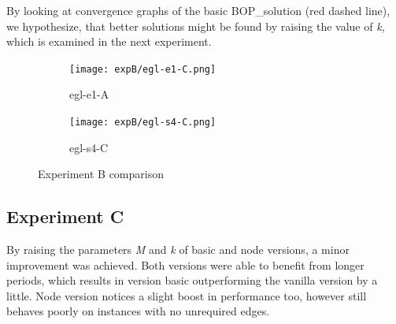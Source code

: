 \documentclass[twoside]{ctuthesis}
\theoremstyle{plain}
\theoremstyle{definition}
\theoremstyle{note}
\begin{document}
By looking at convergence graphs of the basic BOP\_solution (red dashed line), we hypothesize, that better solutions might be found by raising the value of \emph{k}, which is examined in the next experiment.

\begin{figure}[htbp]
\label{f:fff}
	\centering
	\begin{subfigure}{0.49\textwidth}
		\centering
		\texttt{[image: expB/egl-e1-C.png]}
		\caption{egl-e1-A}
	\end{subfigure}
	\hfill
	\begin{subfigure}{0.49\textwidth}
		
		\centering
		\texttt{[image: expB/egl-s4-C.png]}
		\caption{egl-s4-C}
	\end{subfigure}
	\caption{Experiment B comparison}
\end{figure}

\subsection{Experiment C}

By raising the parameters \emph{M} and \emph{k} of basic and node versions, a minor improvement was achieved. Both versions were able to benefit from longer periods, which results in version basic outperforming the vanilla version by a little. Node version notices a slight boost in performance too, however still behaves poorly on instances with no unrequired edges.
\end{document}
